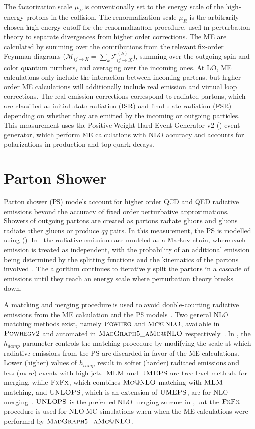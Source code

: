 The factorization scale $\mu_F$ is conventionally set to the energy scale of the high-energy protons in the collision.
The renormalization scale $\mu_R$ is the arbitrarily chosen high-energy cutoff for the renormalization procedure, used in perturbation theory to separate divergences from higher order corrections.
The ME are calculated by summing over the contributions from the relevant fix-order Feynman diagrams ($\mathcal{M}_{i j \rightarrow X}=\sum_k \mathcal{F}_{i j \rightarrow X}^{(k)}$), summing over the outgoing spin and color quantum numbers, and averaging over the incoming ones.
At LO, ME calculations only include the interaction between incoming partons, but higher order ME calculations will additionally include real emission and virtual loop corrections.
The real emission corrections correspond to radiated partons, which are classified as initial state radiation (ISR) and final state radiation (FSR) depending on whether they are emitted by the incoming or outgoing particles.
This measurement uses the Positive Weight Hard Event Generator v2 (\Powheg) event generator, which perform ME calculations with NLO accuracy and accounts for polarizations in \ttbar production and top quark decays.

\section{Parton Shower}
Parton shower (PS) models account for higher order QCD and QED radiative emissions beyond the accuracy of fixed order perturbative approximations.
Showers of outgoing partons are created as partons radiate gluons and gluons radiate other gluons or produce $q\bar{q}$ pairs.
In this measurement, the PS is modelled using (\Pythia).
In \Pythia\ the radiative emissions are modeled as a Markov chain, where each emission is treated as independent, with the probability of an additional emission being determined by the splitting functions and the kinematics of the partons involved~\cite{pythia8.3}.
The algorithm continues to iteratively split the partons in a cascade of emissions until they reach an energy scale where perturbation theory breaks down.

A matching and merging procedure is used to avoid double-counting radiative emissions from the ME calculation and the PS models~\cite{StefanoFrixione_2007}.
Two general NLO matching methods exist, namely $\textsc{Powheg}$ and $\textsc{Mc@NLO}$, available in ${\textsc{Powhegv2}}$ and automated in $\textsc{MadGraph5\_aMc@NLO}$ respectively~\cite{pythia8.3}.
In \Powheg, the $h_{damp}$ parameter controls the matching procedure by modifying the scale at which radiative emissions from the PS are discarded in favor of the ME calculations.
Lower (higher) values of $h_{damp}$ result in softer (harder) radiated emissions and less (more) events with high \pT jets.
$\textsc{MLM}$ and $\textsc{UMEPS}$ are tree-level methods for merging, while $\textsc{FxFx}$, which combines $\textsc{Mc@NLO}$ matching with $\textsc{MLM}$ matching, and $\textsc{UNLOPS}$, which is an extension of $\textsc{UMEPS}$, are for NLO merging~\cite{pythia8.3}.
$\textsc{UNLOPS}$ is the preferred NLO merging scheme in \Pythia, but the $\textsc{FxFx}$ procedure is used for NLO MC simulations when when the ME calculations were performed by $\textsc{MadGraph5\_aMc@NLO}$.

